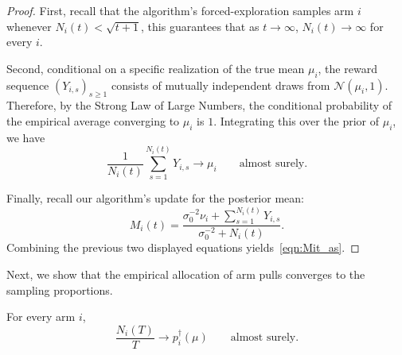 \documentclass[10pt]{article}
\theoremstyle{plain}
\begin{document}
\begin{proof}

First, recall that the algorithm's forced-exploration samples arm $i$ whenever $N_i(t) < \sqrt{t+1}$, this guarantees that as $t \to \infty$, $N_i(t)\to\infty$ for every $i$.

Second, conditional on a specific realization of the true mean $\mu_i$, the reward sequence $(Y_{i,s})_{s\ge1}$ consists of mutually independent draws from $\mathcal N(\mu_i,1)$. Therefore, by the Strong Law of Large Numbers, the conditional probability of the empirical average converging to $\mu_i$ is $1$. Integrating this over the prior of $\mu_i$, we have 
$$\frac1{N_i(t)}
\sum_{s=1}^{N_i(t)}Y_{i,s}
\to
\mu_i
\qquad\text{almost surely}.$$ 

Finally, recall our algorithm's update for the posterior mean:
$$M_i(t)
=
\frac{
\sigma_0^{-2}\nu_i+\sum_{s=1}^{N_i(t)}Y_{i,s}
}{
\sigma_0^{-2}+N_i(t)
}.$$
Combining the previous two displayed equations yields~\eqref{eqn:Mit_as}.  
\end{proof}

Next, we show that the empirical allocation of arm pulls converges to the  sampling proportions. 

\begin{lemma}
\label{lem:pgws-sampling-proportions}
For every arm $i$,
\begin{equation}
\frac{N_i(T)}{T}
\to
p_i^\dagger(\mu)
\qquad\text{almost surely}.    \label{eqn:allocations}
\end{equation}
\end{lemma}
\end{document}
